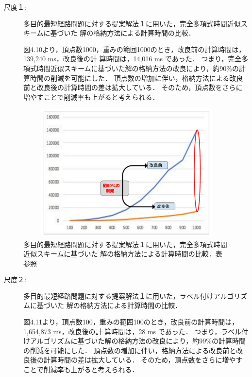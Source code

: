 \documentclass[12pt]{optlab-bachelor}
\begin{document}
\begin{description}
  \item[尺度１:]
  多目的最短経路問題に対する提案解法１に用いた，完全多項式時間近似スキームに基づいた
  解の格納方法による計算時間の比較．

  図4.10より，頂点数1000，重みの範囲1000のとき，改良前の計算時間は，139,240 ms，改良後の計 算時間は，14,016 ms であった．
  つまり，完全多項式時間近似スキームに基づいた解の格納方法の改良により，約90\%の計算時間の削減を可能にした．
  頂点数の増加に伴い，格納方法による改良前と改良後の計算時間の差は拡大している．
  そのため，頂点数をさらに増やすことで削減率も上がると考えられる．

\end{description}

\begin{figure}[htbp]
  \centering
  \includegraphics[height=7.0cm , width=15.0cm]{fig/fig13.pdf}
  \caption{多目的最短経路問題に対する提案解法１に用いた，完全多項式時間近似スキームに基づいた
  解の格納方法による計算時間の比較．表　　参照}
\end{figure}


\begin{description}
  \item[尺度２:]
  多目的最短経路問題に対する提案解法１に用いた，ラベル付けアルゴリズムに基づいた
  解の格納方法による計算時間の比較．

  図4.11より，頂点数100，重みの範囲100のとき，改良前の計算時間は，1,654,873 ms，改良後の計 算時間は，28 ms であった．
  つまり，ラベル付けアルゴリズムに基づいた解の格納方法の改良により，約99\%の計算時間の削減を可能にした．
  頂点数の増加に伴い，格納方法による改良前と改良後の計算時間の差は拡大している．
  そのため，頂点数をさらに増やすことで削減率も上がると考えられる．

\end{description}
\end{document}
